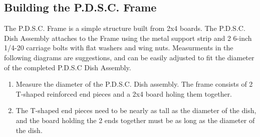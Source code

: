 \documentclass[titlepage]{article}
\begin{document}
        \subsection{Building the P.D.S.C. Frame}
            The P.D.S.C. Frame is a simple structure built from 2x4 boards.  The P.D.S.C. Dish Assembly attaches to the Frame using the metal support strip and 2 6-inch 1/4-20 carriage bolts with flat washers and wing nuts.  Measurments in the following diagrams are suggestions, and can be easily adjusted to fit the diameter of the completed P.D.S.C Dish Assembly.
            \begin{enumerate}
                \item Measure the diameter of the P.D.S.C. Dish assembly. The frame consists of 2 T-shaped reinforced end pieces and a 2x4 board holing them together.
                \item The T-shaped end pieces need to be nearly as tall as the diameter of the dish, and the board holding the 2 ends together must be as long as the diameter of the dish.
            \end{enumerate}
\end{document}
